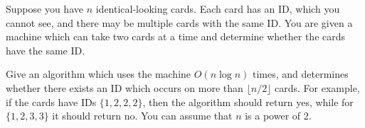 \problem{}
Suppose you have $n$ identical-looking cards.  Each card has an ID, which you cannot see, and there may be multiple cards with the same ID.  You are given a machine which can take two cards at a time and determine whether the cards have the same ID.

Give an algorithm which uses the machine $O(n \log n)$ times, and determines whether there exists an ID which occurs on more than $\lfloor n/2 \rfloor$ cards.  For example, if the cards have IDs $\{1, 2, 2, 2\}$, then the algorithm should return yes, while for $\{1,2,3,3\}$ it should return no.  You can assume that $n$ is a power of 2.

\solution{

}

\newpage